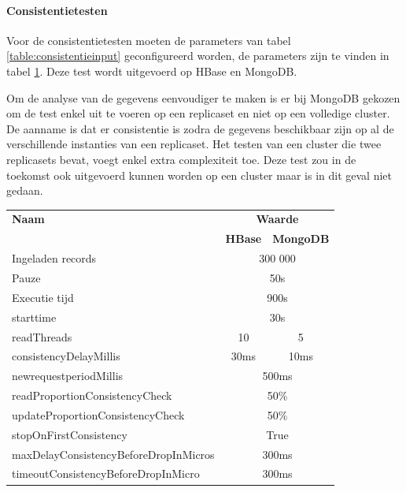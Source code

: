 \paragraph{Consistentietesten} Voor de consistentietesten moeten de parameters van tabel \ref{table:consistentieinput} geconfigureerd worden, de parameters zijn te vinden in tabel \ref{table:consistentie-testen-parameters}. Deze test wordt uitgevoerd op HBase en MongoDB. 

Om de analyse van de gegevens eenvoudiger te maken is er bij MongoDB gekozen om de test enkel uit te voeren op een replicaset en niet op een volledige cluster. De aanname is dat er consistentie is zodra de gegevens beschikbaar zijn op al de verschillende instanties van een replicaset. Het testen van een cluster die twee replicasets bevat, voegt enkel extra complexiteit toe. Deze test zou in de toekomst ook uitgevoerd kunnen worden op een cluster maar is in dit geval niet gedaan.  

\begin{table}[htb!]
	\centering
		\begin{tabular}{l|c c }
			\textbf{Naam} & \multicolumn{2}{c}{\textbf{Waarde}} \\ 
		 	 & \textbf{HBase} & \textbf{MongoDB} \\ \hline
			Ingeladen records  & \multicolumn{2}{c}{300 000} \\
			Pauze & \multicolumn{2}{c}{50s} \\
			Executie tijd & \multicolumn{2}{c}{900s} \\	
			starttime & \multicolumn{2}{c}{30s} \\
			readThreads & 10 & 5\\ 
			consistencyDelayMillis & 30ms & 10ms\\ 
			newrequestperiodMillis & \multicolumn{2}{c}{500ms} \\ 
			readProportionConsistencyCheck & \multicolumn{2}{c}{50\%} \\ 
			updateProportionConsistencyCheck & \multicolumn{2}{c}{50\%} \\ 
			stopOnFirstConsistency & \multicolumn{2}{c}{True} \\ 
			maxDelayConsistencyBeforeDropInMicros & \multicolumn{2}{c}{300ms} \\ 
			timeoutConsistencyBeforeDropInMicro & \multicolumn{2}{c}{300ms} \\
		\end{tabular} 
	\label{table:consistentie-testen-parameters}
\end{table}
